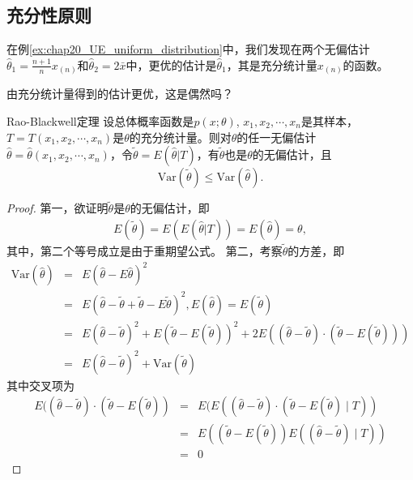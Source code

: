 \subsection{充分性原则}

在例\ref{ex:chap20_UE_uniform_distribution}中，我们发现在两个无偏估计$\hat{\theta}_1 = \frac{n+1}{n}x_{(n)}$和$\hat{\theta}_2 = 2\bar{x}$中，更优的估计是$\hat{\theta}_1$，其是充分统计量$x_{(n)}$的函数。
\begin{problem}
    由充分统计量得到的估计更优，这是偶然吗？
\end{problem}

\begin{theorem}{Rao-Blackwell定理}
    设总体概率函数是$p(x;\theta)$, $x_1,x_2,\cdots,x_n$是其样本， $T = T(x_1,x_2,\cdots,x_n)$是$\theta$的充分统计量。则对$\theta$的任一无偏估计$\hat{\theta} = \hat{\theta}(x_1,x_2,\cdots,x_n)$，令$\tilde{\theta} = E(\hat{\theta}|T)$，有$\tilde{\theta}$也是$\theta$的无偏估计，且
    $$
    \text{Var}(\tilde{\theta}) \leq \text{Var}(\hat{\theta}).
    $$
\end{theorem}
\begin{proof}
第一，欲证明$\tilde{\theta}$是$\theta$的无偏估计，即
\begin{eqnarray*}
    E(\tilde{\theta}) = E( E(\hat{\theta}|T)) = E(\hat{\theta}) = \theta,
\end{eqnarray*}
其中，第二个等号成立是由于重期望公式。
第二，考察$\tilde{\theta}$的方差，即
\begin{eqnarray*}
\text{Var}(\hat{\theta}) &=&E(\hat{\theta}-E \hat{\theta})^{2} \\
&=&E(\hat{\theta}-\tilde{\theta}+\tilde{\theta}-E \tilde{\theta})^{2},E(\hat{\theta } )=E(\tilde{\theta }) \\
&=&E(\hat{\theta}-\tilde{\theta})^{2}+E(\tilde{\theta}-E(\tilde{\theta}))^{2} +2 E((\hat{\theta}-\tilde{\theta}) \cdot(\tilde{\theta}-E(\tilde{\theta}))) \\
&=&E(\hat{\theta}-\tilde{\theta})^{2}+\text{Var}(\tilde{\theta})
\end{eqnarray*}
其中交叉项为
\begin{eqnarray*}
    E((\hat{\theta}-\tilde{\theta}) \cdot(\tilde{\theta}-E(\tilde{\theta}))
&=& E(E((\hat{\theta}-\tilde{\theta}) \cdot(\tilde{\theta}-E(\tilde{\theta}) \mid T))\\
&=& E((\tilde{\theta}-E(\tilde{\theta})) E((\hat{\theta}-\tilde{\theta}) \mid T)) \\
&=& 0
\end{eqnarray*}
\end{proof}
